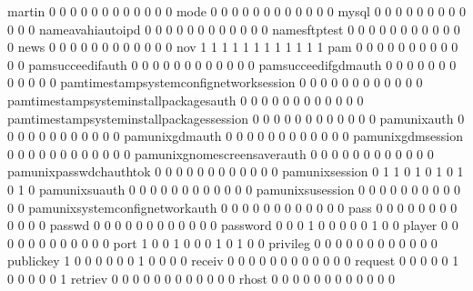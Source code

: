 \documentclass[compress,8pt]{beamer}
\begin{document}
\begin{frame}
\begin{Schunk}
  martin                                    0  0  0  0  0  0  0  0  0  0  0  0
  mode                                      0  0  0  0  0  0  0  0  0  0  0  0
  mysql                                     0  0  0  0  0  0  0  0  0  0  0  0
  nameavahiautoipd                          0  0  0  0  0  0  0  0  0  0  0  0
  namesftptest                              0  0  0  0  0  0  0  0  0  0  0  0
  news                                      0  0  0  0  0  0  0  0  0  0  0  0
  nov                                       1  1  1  1  1  1  1  1  1  1  1  1
  pam                                       0  0  0  0  0  0  0  0  0  0  0  0
  pamsucceedifauth                          0  0  0  0  0  0  0  0  0  0  0  0
  pamsucceedifgdmauth                       0  0  0  0  0  0  0  0  0  0  0  0
  pamtimestampsystemconfignetworksession    0  0  0  0  0  0  0  0  0  0  0  0
  pamtimestampsysteminstallpackagesauth     0  0  0  0  0  0  0  0  0  0  0  0
  pamtimestampsysteminstallpackagessession  0  0  0  0  0  0  0  0  0  0  0  0
  pamunixauth                               0  0  0  0  0  0  0  0  0  0  0  0
  pamunixgdmauth                            0  0  0  0  0  0  0  0  0  0  0  0
  pamunixgdmsession                         0  0  0  0  0  0  0  0  0  0  0  0
  pamunixgnomescreensaverauth               0  0  0  0  0  0  0  0  0  0  0  0
  pamunixpasswdchauthtok                    0  0  0  0  0  0  0  0  0  0  0  0
  pamunixsession                            0  1  1  0  1  0  1  0  1  0  1  0
  pamunixsuauth                             0  0  0  0  0  0  0  0  0  0  0  0
  pamunixsusession                          0  0  0  0  0  0  0  0  0  0  0  0
  pamunixsystemconfignetworkauth            0  0  0  0  0  0  0  0  0  0  0  0
  pass                                      0  0  0  0  0  0  0  0  0  0  0  0
  passwd                                    0  0  0  0  0  0  0  0  0  0  0  0
  password                                  0  0  0  1  0  0  0  0  0  1  0  0
  player                                    0  0  0  0  0  0  0  0  0  0  0  0
  port                                      1  0  0  1  0  0  0  1  0  1  0  0
  privileg                                  0  0  0  0  0  0  0  0  0  0  0  0
  publickey                                 1  0  0  0  0  0  0  1  0  0  0  0
  receiv                                    0  0  0  0  0  0  0  0  0  0  0  0
  request                                   0  0  0  0  0  1  0  0  0  0  0  1
  retriev                                   0  0  0  0  0  0  0  0  0  0  0  0
  rhost                                     0  0  0  0  0  0  0  0  0  0  0  0

\end{Schunk}
\end{frame}
\end{document}
